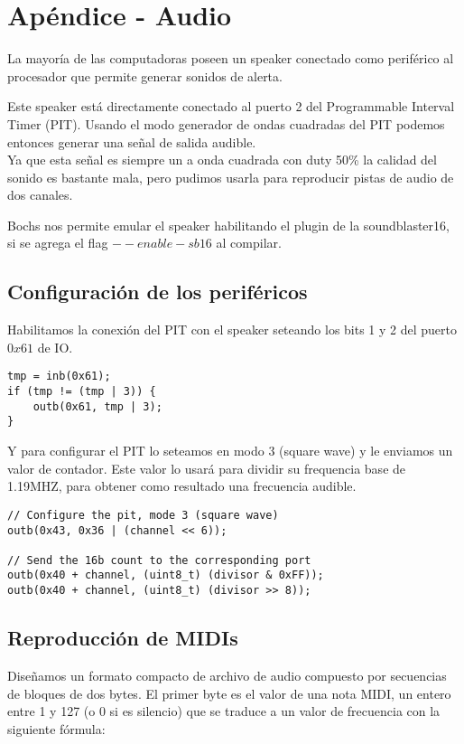 \section{Apéndice - Audio}

La mayoría de las computadoras poseen un speaker conectado como periférico
al procesador que permite generar sonidos de alerta.

Este speaker está directamente conectado al puerto 2 del Programmable Interval Timer (PIT).
Usando el modo generador de ondas cuadradas del PIT podemos entonces generar una señal de salida audible. \\
Ya que esta señal es siempre un a onda cuadrada con duty 50\% la calidad del sonido es bastante mala,
pero pudimos usarla para reproducir pistas de audio de dos canales.

Bochs nos permite emular el speaker habilitando el plugin de la soundblaster16, si se agrega el flag $--enable-sb16$ al compilar.

\subsection{Configuración de los periféricos}
\label{audio}

Habilitamos la conexión del PIT con el speaker seteando los bits 1 y 2 del puerto $0x61$ de IO.

\begin{lstlisting}
tmp = inb(0x61);
if (tmp != (tmp | 3)) {
    outb(0x61, tmp | 3);
}
\end{lstlisting}

Y para configurar el PIT lo seteamos en modo 3 (square wave) y le enviamos un valor de contador.
Este valor lo usará para dividir su frequencia base de 1.19MHZ, para obtener como resultado una frecuencia audible.

\begin{lstlisting}
// Configure the pit, mode 3 (square wave)
outb(0x43, 0x36 | (channel << 6));

// Send the 16b count to the corresponding port
outb(0x40 + channel, (uint8_t) (divisor & 0xFF));
outb(0x40 + channel, (uint8_t) (divisor >> 8));
\end{lstlisting}

\subsection{Reproducción de MIDIs}

Diseñamos un formato compacto de archivo de audio compuesto por secuencias de bloques de dos bytes.
El primer byte es el valor de una nota MIDI, un entero entre 1 y 127 (o 0 si es silencio) que se
traduce a un valor de frecuencia con la siguiente fórmula:

